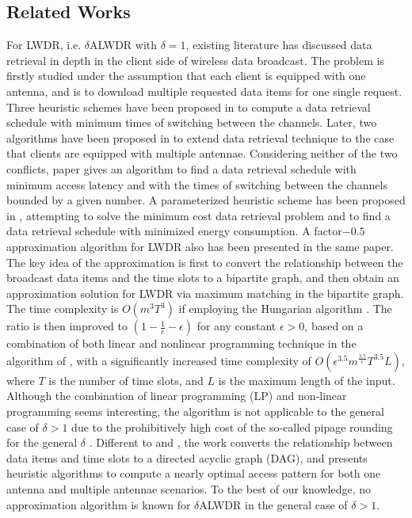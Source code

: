 \documentclass[11pt,english,onecolumn,draftcls]{IEEEtran}
\theoremstyle{plain}
\theoremstyle{plain}
\theoremstyle{plain}
\theoremstyle{plain}
\begin{document}
\subsection{Related Works}

For LWDR, i.e. $\delta$ALWDR with $\delta=1$, existing literature
has discussed data retrieval in depth in the client side of wireless
data broadcast. The problem is firstly studied under the assumption
that each client is equipped with one antenna, and is to download
multiple requested data items for one single request. Three heuristic
schemes have been proposed in \cite{hurson2006power} to compute a
data retrieval schedule with minimum times of switching between the
channels. Later, two algorithms have been proposed in \cite{Shi2010efficient}
to extend data retrieval technique to the case that clients are equipped
with multiple antennae. Considering neither of the two conflicts,
paper \cite{Gao2011} gives an algorithm to find a data retrieval
schedule with minimum access latency and with the times of switching
between the channels bounded by a given number. A parameterized heuristic
scheme has been proposed in \cite{Infocom12LuEfficient}, attempting
to solve the minimum cost data retrieval problem and to find a data
retrieval schedule with minimized energy consumption. A factor$-0.5$
approximation algorithm for LWDR also has been presented in the same
paper. The key idea of the approximation is first to convert the relationship
between the broadcast data items and the time slots to a bipartite
graph, and then obtain an approximation solution for LWDR via maximum
matching in the bipartite graph. The time complexity is $O(m^{3}T^{3})$
if employing the Hungarian algorithm \cite{korte2002combinatorial}.
The ratio is then improved to $(1-\frac{1}{e}-\epsilon)$ for any
constant $\epsilon>0$, based on a combination of both linear and
nonlinear programming technique in the algorithm of \cite{lu2014data},
with a significantly increased time complexity of $O(\epsilon^{3.5}m^{\frac{3.5}{\epsilon}}T^{3.5}L)$,
where $T$ is the number of time slots, and $L$ is the maximum length
of the input. Although the combination of linear programming (LP)
and non-linear programming seems interesting, the algorithm is not
applicable to the general case of $\delta>1$ due to the prohibitively
high cost of the so-called pipage rounding for the general $\delta$
\cite{lu2014data}. Different to \cite{Infocom12LuEfficient} and
\cite{lu2014data}, the work \cite{He2013Efficient} converts the
relationship between data items and time slots to a directed acyclic
graph (DAG), and presents heuristic algorithms to compute a nearly
optimal access pattern for both one antenna and multiple antennae
scenarios. To the best of our knowledge, no approximation algorithm
is known for $\delta$ALWDR in the general case of $\delta>1$.
\end{document}
